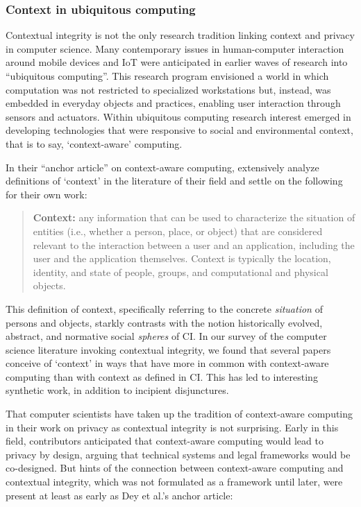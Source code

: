 \documentclass[../thesis.tex]{subfiles}
\begin{document}
\subsubsection{Context in ubiquitous computing}
\label{CI2.2.1}

Contextual integrity is not the only research tradition linking context
and privacy in computer science. Many contemporary issues in
human-computer interaction around mobile devices and IoT were
anticipated in earlier waves of research into
``ubiquitous computing''. This
research program envisioned a world in which computation was not
restricted to specialized workstations but, instead, was embedded in
everyday objects and practices, enabling user interaction through
sensors and actuators. Within ubiquitous computing research interest
emerged in developing technologies that were responsive to social and
environmental context, that is to say,
`context-aware' computing.

In their ``anchor article'' on
context-aware computing, \citet{dey2001conceptual}
extensively analyze
definitions of `context' in the
literature of their field and settle on the following for their own
work:

\begin{quote}
\textbf{Context:}
any information that can be used to characterize the situation of
entities (i.e., whether a person, place, or object) that are considered
relevant to the interaction between a user and an application,
including the user and the application themselves. Context is typically
the location, identity, and state of people, groups, and computational
and physical objects. \citep{dey2001conceptual}
\end{quote}

This definition of context, specifically referring to the concrete
\textit{situation} of persons and objects, starkly contrasts with the
notion historically evolved, abstract, and normative social
\textit{spheres} of CI. In our survey of the computer science
literature invoking contextual integrity, we found that several papers
conceive of `context' in ways that have
more in common with context-aware computing than with context as
defined in CI. This has led to interesting synthetic work, in addition
to incipient disjunctures. 

That computer scientists have taken up the tradition of context-aware
computing in their work on privacy as contextual integrity is not
surprising. Early in this field, contributors
\citet{ackerman2001privacy}
anticipated that
context-aware
computing would lead to privacy by design, arguing that technical
systems and legal frameworks would be co-designed. But hints of the
connection between context-aware computing and contextual integrity,
which was not formulated as a framework until later, were present at
least as early as Dey et al.'s anchor article:
\end{document}
